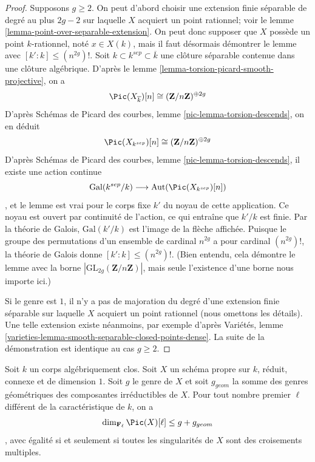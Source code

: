 \begin{proof}
Supposons $g \geq 2$. On peut d'abord choisir une extension finie séparable de degré au plus $2g - 2$ sur laquelle $X$ acquiert un point rationnel; voir le lemme \ref{lemma-point-over-separable-extension}. On peut donc supposer que $X$ possède un point $k$-rationnel, noté $x \in X(k)$, mais il faut désormais démontrer le lemme avec $[k' : k] \leq (n^{2g})!$. Soit $k \subset k^{sep} \subset \overline{k}$ une clôture séparable contenue dans une clôture algébrique. D'après le lemme \ref{lemma-torsion-picard-smooth-projective}, on a $$
\Pic(X_{\overline{k}})[n] \cong (\mathbf{Z}/n\mathbf{Z})^{\oplus 2g}
$$ D'après Schémas de Picard des courbes, lemme \ref{pic-lemma-torsion-descends}, on en déduit $$
\Pic(X_{k^{sep}})[n] \cong (\mathbf{Z}/n\mathbf{Z})^{\oplus 2g}
$$ D'après Schémas de Picard des courbes, lemme \ref{pic-lemma-torsion-descends}, il existe une action continue $$
\text{Gal}(k^{sep}/k)
\longrightarrow
\text{Aut}(\Pic(X_{k^{sep}})[n])
$$, et le lemme est vrai pour le corps fixe $k'$ du noyau de cette application. Ce noyau est ouvert par continuité de l'action, ce qui entraîne que $k'/k$ est finie. Par la théorie de Galois, $\text{Gal}(k'/k)$ est l'image de la flèche affichée. Puisque le groupe des permutations d'un ensemble de cardinal $n^{2g}$ a pour cardinal $(n^{2g})!$, la théorie de Galois donne $[k' : k] \leq (n^{2g})!$. (Bien entendu, cela démontre le lemme avec la borne $|\text{GL}_{2g}(\mathbf{Z}/n\mathbf{Z})|$, mais seule l'existence d'une borne nous importe ici.)

\medskip\noindent
Si le genre est $1$, il n'y a pas de majoration du degré d'une extension finie séparable sur laquelle $X$ acquiert un point rationnel (nous omettons les détails). Une telle extension existe néanmoins, par exemple d'après Variétés, lemme \ref{varieties-lemma-smooth-separable-closed-points-dense}. La suite de la démonstration est identique au cas $g \geq 2$.
\end{proof}

\begin{proposition}
\label{proposition-torsion-picard-reduced-proper}
Soit $k$ un corps algébriquement clos. Soit $X$ un schéma propre sur $k$, réduit, connexe et de dimension $1$. Soit $g$ le genre de $X$ et soit $g_{geom}$ la somme des genres géométriques des composantes irréductibles de $X$. Pour tout nombre premier $\ell$ différent de la caractéristique de $k$, on a $$
\dim_{\mathbf{F}_\ell} \Pic(X)[\ell]
\leq g + g_{geom}
$$, avec égalité si et seulement si toutes les singularités de $X$ sont des croisements multiples.
\end{proposition}


